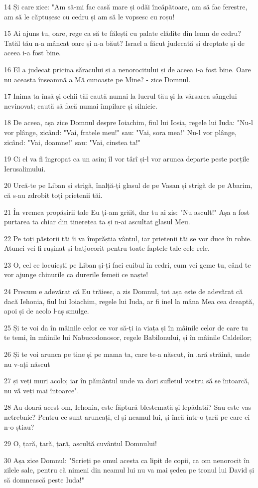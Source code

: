 \par 14 Și care zice: "Am să-mi fac casă mare și odăi încăpătoare, am să fac ferestre, am să le căptușesc cu cedru și am să le vopsesc cu roșu!
\par 15 Ai ajuns tu, oare, rege ca să te fălești cu palate clădite din lemn de cedru? Tatăl tău n-a mâncat oare și n-a băut? Israel a făcut judecată și dreptate și de aceea i-a fost bine.
\par 16 El a judecat pricina săracului și a nenorocitului și de aceea i-a fost bine. Oare nu aceasta înseamnă a Mă cunoaște pe Mine? - zice Domnul.
\par 17 Inima ta însă și ochii tăi caută numai la lucrul tău și la vărsarea sângelui nevinovat; caută să facă numai împilare și silnicie.
\par 18 De aceea, așa zice Domnul despre Ioiachim, fiul lui Iosia, regele lui Iuda: "Nu-l vor plânge, zicând: "Vai, fratele meu!" sau: "Vai, sora mea!" Nu-l vor plânge, zicând: "Vai, doamne!" sau: "Vai, cinstea ta!"
\par 19 Ci el va fi îngropat ca un asin; îl vor târî și-l vor arunca departe peste porțile Ierusalimului.
\par 20 Urcă-te pe Liban și strigă, înalță-ți glasul de pe Vasan și strigă de pe Abarim, că s-au zdrobit toți prietenii tăi.
\par 21 În vremea propășirii tale Eu ți-am grăit, dar tu ai zis: "Nu ascult!" Așa a fost purtarea ta chiar din tinerețea ta și n-ai ascultat glasul Meu.
\par 22 Pe toți păstorii tăi îi va împrăștia vântul, iar prietenii tăi se vor duce în robie. Atunci vei fi rușinat și batjocorit pentru toate faptele tale cele rele.
\par 23 O, cel ce locuiești pe Liban și-ți faci cuibul în cedri, cum vei geme tu, când te vor ajunge chinurile ca durerile femeii ce naște!
\par 24 Precum e adevărat că Eu trăiesc, a zis Domnul, tot așa este de adevărat că dacă Iehonia, fiul lui Ioiachim, regele lui Iuda, ar fi inel la mâna Mea cea dreaptă, apoi și de acolo l-aș smulge.
\par 25 Și te voi da în mâinile celor ce vor să-ți ia viața și în mâinile celor de care tu te temi, în mâinile lui Nabucodonosor, regele Babilonului, și în mâinile Caldeilor;
\par 26 Și te voi arunca pe tine și pe mama ta, care te-a născut, în .ară străină, unde nu v-ați născut
\par 27 și veți muri acolo; iar în pământul unde va dori sufletul vostru să se întoarcă, nu vă veți mai întoarce".
\par 28 Au doară acest om, Iehonia, este făptură blestemată și lepădată? Sau este vas netrebnic? Pentru ce sunt aruncați, el și neamul lui, și încă într-o țară pe care ei n-o știau?
\par 29 O, țară, țară, țară, ascultă cuvântul Domnului!
\par 30 Așa zice Domnul: "Scrieți pe omul acesta ca lipit de copii, ca om nenorocit în zilele sale, pentru că nimeni din neamul lui nu va mai ședea pe tronul lui David și să domnească peste Iuda!"

